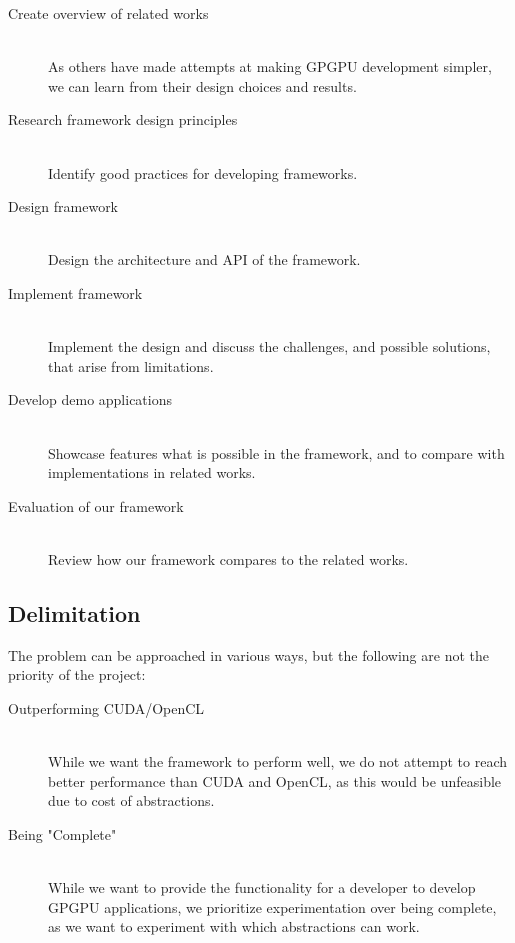 \begin{description}
\item[Create overview of related works] \hfill \\
As others have made attempts at making GPGPU development simpler, we can learn from their design choices and results.
\item[Research framework design principles] \hfill \\
Identify good practices for developing frameworks.
\item[Design framework] \hfill \\
Design the architecture and API of the framework.
\item[Implement framework] \hfill \\
Implement the design and discuss the challenges, and possible solutions, that arise from limitations.
\item[Develop demo applications] \hfill \\
Showcase features what is possible in the framework, and to compare with implementations in related works.
\item[Evaluation of our framework] \hfill \\
Review how our framework compares to the related works.
\end{description}

\subsection{Delimitation}
The problem can be approached in various ways, but the following are not the priority of the project:


\begin{description}
\item[Outperforming CUDA/OpenCL] \hfill \\
While we want the framework to perform well, we do not attempt to reach better performance than CUDA and OpenCL, as this would be unfeasible due to cost of abstractions.
\item[Being "Complete"] \hfill \\
While we want to provide the functionality for a developer to develop GPGPU applications, we prioritize experimentation over being complete, as we want to experiment with which abstractions can work.
\end{description}